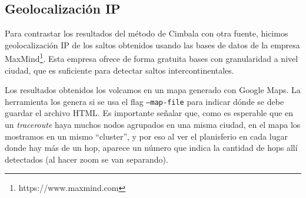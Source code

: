 \subsection{Geolocalización IP}

Para contrastar los resultados del método de Cimbala con otra fuente, hicimos
geolocalización IP de los saltos obtenidos usando las bases de datos de la
empresa MaxMind\footnote{https://www.maxmind.com}. Esta empresa ofrece de
forma gratuita bases con granularidad a nivel ciudad, que es suficiente para
detectar saltos intercontinentales.

Los resultados obtenidos los volcamos en un mapa generado con Google Maps. La
herramienta los genera si se usa el flag \texttt{--map-file} para indicar
dónde se debe guardar el archivo HTML. Es importante señalar que, como es
esperable que en un \emph{traceroute} haya muchos nodos agrupados en una misma
ciudad, en el mapa los mostramos en un mismo ``cluster'', y por eso al ver el
planisferio en cada lugar donde hay más de un hop, aparece un número que
indica la cantidad de hops allí detectados (al hacer zoom se van separando).
